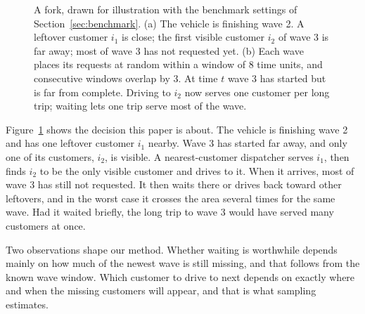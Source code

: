 \documentclass[5p,times,authoryear]{elsarticle}
\begin{document}
\begin{figure}[t]
\caption{A fork, drawn for illustration with the benchmark settings of Section~\ref{sec:benchmark}. (a) The vehicle is finishing wave 2. A leftover customer $i_1$ is close; the first visible customer $i_2$ of wave 3 is far away; most of wave 3 has not requested yet. (b) Each wave places its requests at random within a window of 8 time units, and consecutive windows overlap by 3. At time $t$ wave 3 has started but is far from complete. Driving to $i_2$ now serves one customer per long trip; waiting lets one trip serve most of the wave.}
\label{fig:motivation}
\end{figure}

Figure~\ref{fig:motivation} shows the decision this paper is about. The vehicle is finishing wave 2 and has one leftover customer $i_1$ nearby. Wave 3 has started far away, and only one of its customers, $i_2$, is visible. A nearest-customer dispatcher serves $i_1$, then finds $i_2$ to be the only visible customer and drives to it. When it arrives, most of wave 3 has still not requested. It then waits there or drives back toward other leftovers, and in the worst case it crosses the area several times for the same wave. Had it waited briefly, the long trip to wave 3 would have served many customers at once.

Two observations shape our method. Whether waiting is worthwhile depends mainly on how much of the newest wave is still missing, and that follows from the known wave window. Which customer to drive to next depends on exactly where and when the missing customers will appear, and that is what sampling estimates.
\end{document}
